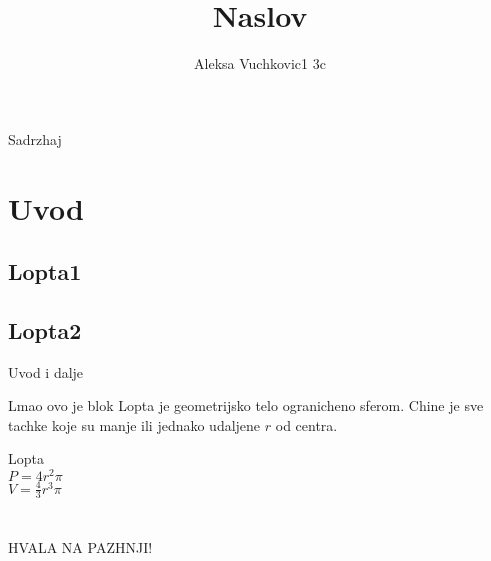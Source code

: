 \documentclass{beamer}
\title{\textbf{Naslov}}
\author{Aleksa Vuchkovic1 3c}
\institute{Matematichka gimnazija, Beograd}
\date{}
\begin{document}
\maketitle

\begin{frame}{Sadrzhaj}
\tableofcontents
\end{frame}

\section{Uvod}
\subsection{Lopta1}
\subsection{Lopta2}
\begin{frame}{Uvod i dalje}
\begin{block}{Lmao ovo je blok}
Lopta je geometrijsko telo ogranicheno sferom. Chine je sve tachke koje su manje ili jednako udaljene $r$ od centra.
\end{block}
Lopta\\
\Large$P=4r^2\pi$\\
\Large$V=\frac{4}{3}r^3\pi$
\end{frame}

\section{}
\begin{frame}
\centering\LARGE HVALA NA PAZHNJI!
\end{frame}
\end{document}
